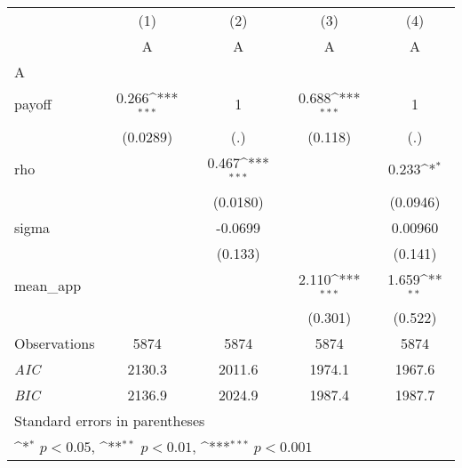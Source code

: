 {
\def\sym#1{\ifmmode^{#1}\else\(^{#1}\)\fi}
\begin{tabular}{l*{4}{c}}
\hline\hline
                    &\multicolumn{1}{c}{(1)}&\multicolumn{1}{c}{(2)}&\multicolumn{1}{c}{(3)}&\multicolumn{1}{c}{(4)}\\
                    &\multicolumn{1}{c}{A}&\multicolumn{1}{c}{A}&\multicolumn{1}{c}{A}&\multicolumn{1}{c}{A}\\
\hline
A                   &                     &                     &                     &                     \\
payoff              &       0.266\sym{***}&           1         &       0.688\sym{***}&           1         \\
                    &    (0.0289)         &         (.)         &     (0.118)         &         (.)         \\
[1em]
rho                 &                     &       0.467\sym{***}&                     &       0.233\sym{*}  \\
                    &                     &    (0.0180)         &                     &    (0.0946)         \\
[1em]
sigma               &                     &     -0.0699         &                     &     0.00960         \\
                    &                     &     (0.133)         &                     &     (0.141)         \\
[1em]
mean\_app            &                     &                     &       2.110\sym{***}&       1.659\sym{**} \\
                    &                     &                     &     (0.301)         &     (0.522)         \\
\hline
Observations        &        5874         &        5874         &        5874         &        5874         \\
\textit{AIC}        &      2130.3         &      2011.6         &      1974.1         &      1967.6         \\
\textit{BIC}        &      2136.9         &      2024.9         &      1987.4         &      1987.7         \\
\hline\hline
\multicolumn{5}{l}{\footnotesize Standard errors in parentheses}\\
\multicolumn{5}{l}{\footnotesize \sym{*} \(p<0.05\), \sym{**} \(p<0.01\), \sym{***} \(p<0.001\)}\\
\end{tabular}
}
